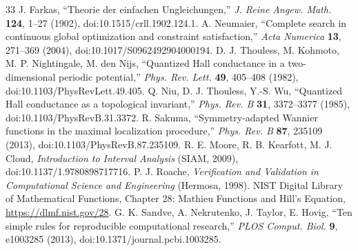 \documentclass[11pt]{article}
\begin{document}
\begin{thebibliography}{33}
 J. Farkas, ``Theorie der einfachen Ungleichungen,'' \emph{J. Reine Angew. Math.} \textbf{124}, 1--27 (1902), doi:10.1515/crll.1902.124.1.
 A. Neumaier, ``Complete search in continuous global optimization and constraint satisfaction,'' \emph{Acta Numerica} \textbf{13}, 271--369 (2004), doi:10.1017/S0962492904000194.
 D. J. Thouless, M. Kohmoto, M. P. Nightingale, M. den Nijs, ``Quantized Hall conductance in a two-dimensional periodic potential,'' \emph{Phys. Rev. Lett.} \textbf{49}, 405--408 (1982), doi:10.1103/PhysRevLett.49.405.
 Q. Niu, D. J. Thouless, Y.-S. Wu, ``Quantized Hall conductance as a topological invariant,'' \emph{Phys. Rev. B} \textbf{31}, 3372--3377 (1985), doi:10.1103/PhysRevB.31.3372.
 R. Sakuma, ``Symmetry-adapted Wannier functions in the maximal localization procedure,'' \emph{Phys. Rev. B} \textbf{87}, 235109 (2013), doi:10.1103/PhysRevB.87.235109.
 R. E. Moore, R. B. Kearfott, M. J. Cloud, \emph{Introduction to Interval Analysis} (SIAM, 2009), doi:10.1137/1.9780898717716.
 P. J. Roache, \emph{Verification and Validation in Computational Science and Engineering} (Hermosa, 1998).
 NIST Digital Library of Mathematical Functions, Chapter 28: Mathieu Functions and Hill's Equation, \url{https://dlmf.nist.gov/28}.
 G. K. Sandve, A. Nekrutenko, J. Taylor, E. Hovig, ``Ten simple rules for reproducible computational research,'' \emph{PLOS Comput. Biol.} \textbf{9}, e1003285 (2013), doi:10.1371/journal.pcbi.1003285.
\end{thebibliography}
\end{document}
